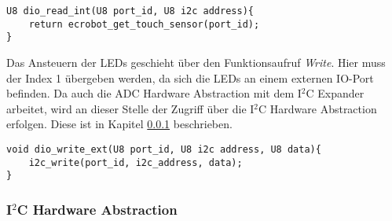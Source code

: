 \begin{lstlisting}[frame=single,caption={Aufruf der internen DIO-Read Funktion},captionpos=b]  
U8 dio_read_int(U8 port_id, U8 i2c address){
	return ecrobot_get_touch_sensor(port_id);
}
\end{lstlisting}\newline\newline
Das Ansteuern der LEDs geschieht über den Funktionsaufruf \textit{Write}. Hier muss der Index 1 übergeben werden, da sich die LEDs an einem externen IO-Port befinden. Da auch die ADC Hardware Abstraction mit dem I$^2$C Expander arbeitet, wird an dieser Stelle der Zugriff über die I$^2$C Hardware Abstraction erfolgen. Diese ist in Kapitel \ref{i2cabstraction} beschrieben.

\begin{lstlisting}[frame=single,caption={Aufruf der I$^2$C Hardware Abstraction},captionpos=b]  
void dio_write_ext(U8 port_id, U8 i2c address, U8 data){
	i2c_write(port_id, i2c_address, data);
}
\end{lstlisting}\newline\newline
 


\subsubsection{I$^2$C Hardware Abstraction} \label{i2cabstraction}

